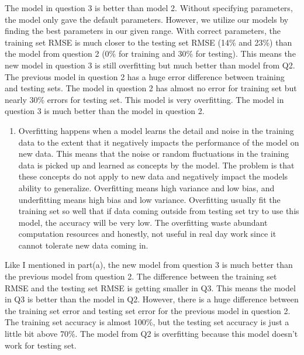 \documentclass[11pt]{article}
\providecommand{\tightlist}{%
      \setlength{\itemsep}{0pt}\setlength{\parskip}{0pt}}
\begin{document}
The model in question 3 is better than model 2. Without specifying
parameters, the model only gave the default parameters. However, we
utilize our models by finding the best parameters in our given range.
With correct parameters, the training set RMSE is much closer to the
testing set RMSE (14\% and 23\%) than the model from question 2 (0\% for
training and 30\% for testing). This means the new model in question 3
is still overfitting but much better than model from Q2. The previous
model in question 2 has a huge error difference between training and
testing sets. The model in question 2 has almost no error for training
set but nearly 30\% errors for testing set. This model is very
overfitting. The model in question 3 is much better than the model in
question 2.

    \begin{enumerate}
\def\labelenumi{\alph{enumi})}
\setcounter{enumi}{1}
\tightlist
\item
  Overfitting happens when a model learns the detail and noise in the
  training data to the extent that it negatively impacts the performance
  of the model on new data. This means that the noise or random
  fluctuations in the training data is picked up and learned as concepts
  by the model. The problem is that these concepts do not apply to new
  data and negatively impact the models ability to generalize.
  Overfitting means high variance and low bias, and underfitting means
  high bias and low variance. Overfitting usually fit the training set
  so well that if data coming outside from testing set try to use this
  model, the accuracy will be very low. The overfitting waste abundant
  computation resources and honestly, not useful in real day work since
  it cannot tolerate new data coming in.
\end{enumerate}

Like I mentioned in part(a), the new model from question 3 is much
better than the previous model from question 2. The difference between
the training set RMSE and the testing set RMSE is getting smaller in Q3.
This means the model in Q3 is better than the model in Q2. However,
there is a huge difference between the training set error and testing
set error for the previous model in question 2. The training set
accuracy is almost 100\%, but the testing set accuracy is just a little
bit above 70\%. The model from Q2 is overfitting because this model
doesn't work for testing set.
\end{document}
